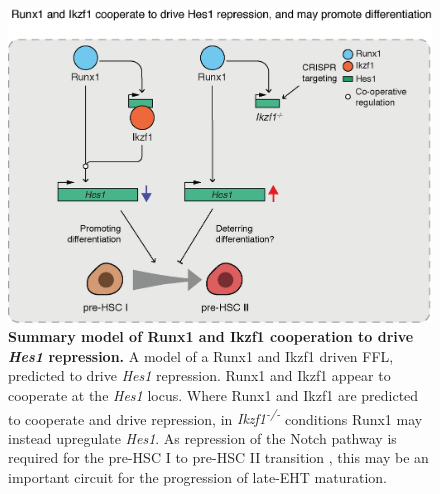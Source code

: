 \begin{figure}[t]
    \centering
    \includegraphics[width=\textwidth,height=\textheight,keepaspectratio]{figures/models/ch3_model-runx1-ikzf1-hes1.png}
    \caption[{Summary model of Runx1 and Ikzf1 cooperation to drive \textit{Hes1} repression.}]
    {\textbf{Summary model of Runx1 and Ikzf1 cooperation to drive \textit{Hes1} repression.}
    A model of a Runx1 and Ikzf1 driven FFL, predicted to drive \textit{Hes1} repression. Runx1 and Ikzf1 appear to cooperate at the \textit{Hes1} locus. Where Runx1 and Ikzf1 are predicted to cooperate and drive repression, in \textit{Ikzf1\textsuperscript{-/-}} conditions Runx1 may instead upregulate \textit{Hes1}. As repression of the Notch pathway is required for the pre-HSC I to pre-HSC II transition \citep{souilhol_developing_2016}, this may be an important circuit for the progression of late-EHT maturation. 
    }
    \label{fig:ch3_model-runx1-ikzf1-hes1}
\end{figure}


